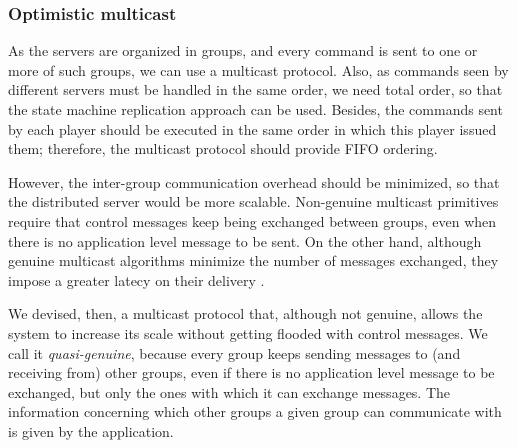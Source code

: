 \documentclass[]{usiinfprospectus}
\begin{document}
% 



\subsubsection{Optimistic multicast} \label{sec:optmcast}

As the servers are organized in groups, and every command is sent to one or more of such groups, we can use a multicast protocol. Also, as commands seen by different servers must be handled in the same order, we need total order, so that the state machine replication approach can be used. Besides, the commands sent by each player should be executed in the same order in which this player issued them; therefore, the multicast protocol should provide FIFO ordering.

However, the inter-group communication overhead should be minimized, so that the distributed server would be more scalable. Non-genuine multicast primitives \cite{schiper2009gng} require that control messages keep being exchanged between groups, even when there is no application level message to be sent. On the other hand, although genuine multicast algorithms minimize the number of messages exchanged, they impose a greater latecy on their delivery \cite{schiper2008ica}.

We devised, then, a multicast protocol that, although not genuine, allows the system to increase its scale without getting flooded with control messages. We call it \emph{quasi-genuine}, because every group keeps sending messages to (and receiving from) other groups, even if there is no application level message to be exchanged, but only the ones with which it can exchange messages. The information concerning which other groups a given group can communicate with is given by the application.
\end{document}
